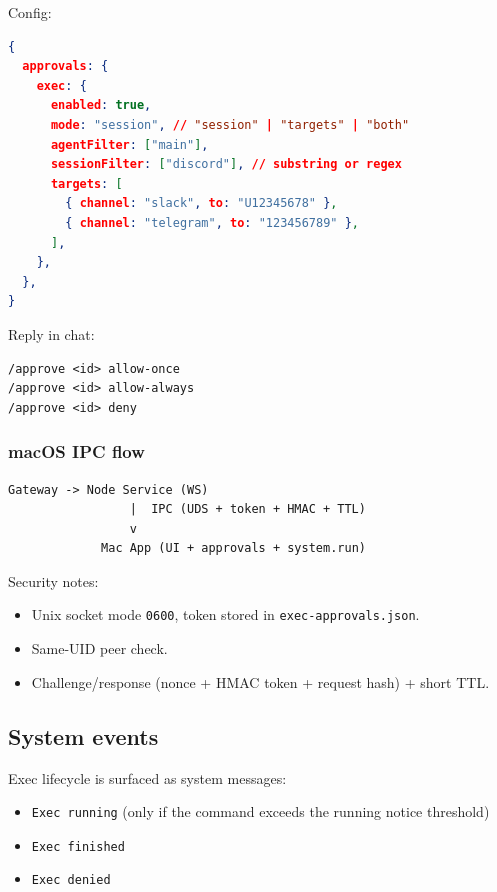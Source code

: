 Config:

\begin{lstlisting}[language=json]
{
  approvals: {
    exec: {
      enabled: true,
      mode: "session", // "session" | "targets" | "both"
      agentFilter: ["main"],
      sessionFilter: ["discord"], // substring or regex
      targets: [
        { channel: "slack", to: "U12345678" },
        { channel: "telegram", to: "123456789" },
      ],
    },
  },
}
\end{lstlisting}


Reply in chat:

\begin{lstlisting}
/approve <id> allow-once
/approve <id> allow-always
/approve <id> deny
\end{lstlisting}


\subsubsection{macOS IPC flow}


\begin{lstlisting}
Gateway -> Node Service (WS)
                 |  IPC (UDS + token + HMAC + TTL)
                 v
             Mac App (UI + approvals + system.run)
\end{lstlisting}


Security notes:

\begin{itemize}
  \item Unix socket mode \texttt{0600}, token stored in \texttt{exec-approvals.json}.
  \item Same-UID peer check.
  \item Challenge/response (nonce + HMAC token + request hash) + short TTL.
\end{itemize}


\subsection{System events}


Exec lifecycle is surfaced as system messages:

\begin{itemize}
  \item \texttt{Exec running} (only if the command exceeds the running notice threshold)
  \item \texttt{Exec finished}
  \item \texttt{Exec denied}
\end{itemize}



